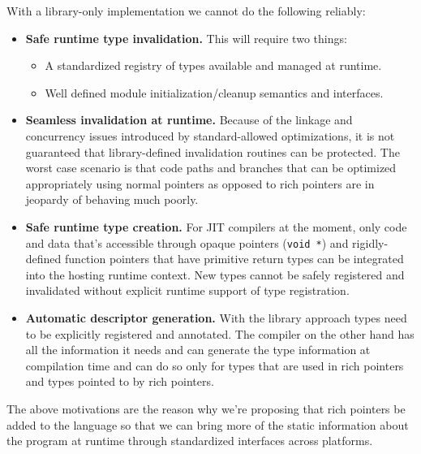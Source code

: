 With a library-only implementation we cannot do the following reliably:

\begin{itemize}

  \item \textbf{Safe runtime type invalidation.} This will require two things:

  \begin{itemize}

   \item A standardized registry of types available and managed at runtime.

   \item Well defined module initialization/cleanup semantics and interfaces.

  \end{itemize}

  \item \textbf{Seamless invalidation at runtime.} Because of the linkage and
  concurrency issues introduced by standard-allowed optimizations, it is not
  guaranteed that library-defined invalidation routines can be protected. The
  worst case scenario is that code paths and branches that can be optimized
  appropriately using normal pointers as opposed to rich pointers are in
  jeopardy of behaving much poorly.

  \item \textbf{Safe runtime type creation.} For JIT compilers at the moment,
  only code and data that’s accessible through opaque pointers (\verb+void *+)
  and rigidly-defined function pointers that have primitive return types can
  be integrated into the hosting runtime context. New types cannot be safely
  registered and invalidated without explicit runtime support of type
  registration.

  \item \textbf{Automatic descriptor generation.} With the library approach
  types need to be explicitly registered and annotated. The compiler on the
  other hand has all the information it needs and can generate the type
  information at compilation time and can do so only for types that are used
  in rich pointers and types pointed to by rich pointers.

\end{itemize}

The above motivations are the reason why we’re proposing that rich pointers be
added to the language so that we can bring more of the static information
about the program at runtime through standardized interfaces across platforms.